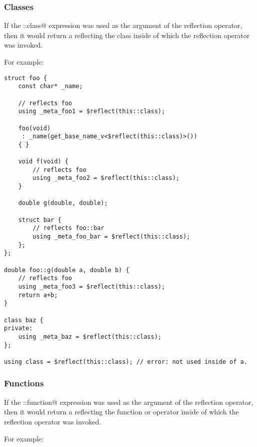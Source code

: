 \subsubsection{Classes}

If the \verb@this::class@ expression was used as the argument of the reflection
operator, then it would return a  reflecting the class
inside of which the reflection operator was invoked.

For example:

\begin{verbatim}
struct foo {
	const char* _name;

	// reflects foo
	using _meta_foo1 = $reflect(this::class);

	foo(void)
	 : _name(get_base_name_v<$reflect(this::class)>())
	{ }

	void f(void) {
		// reflects foo
		using _meta_foo2 = $reflect(this::class);
	}

	double g(double, double);

	struct bar {
		// reflects foo::bar
		using _meta_foo_bar = $reflect(this::class);
	};
};

double foo::g(double a, double b) {
	// reflects foo
	using _meta_foo3 = $reflect(this::class);
	return a+b;
}

class baz {
private:
	using _meta_baz = $reflect(this::class);
};

using class = $reflect(this::class); // error: not used inside of a.

\end{verbatim}

\subsubsection{Functions}

If the \verb@this::function@ expression was used as the argument of the reflection
operator, then it would return a  reflecting the function or operator
inside of which the reflection operator was invoked.

For example:

